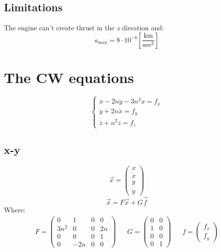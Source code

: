\documentclass[11pt, a4paper]{article}
\begin{document}
\subsection{Limitations}
The engine can't create thrust in the \emph{x} direation and:
\begin{equation*}
    a_\text{max} = 8\cdot10^{-6}\left[\frac{\mathrm{km}}{\mathrm{sec}^2}\right]
\end{equation*}

\section{The CW equations}
\begin{equation}
    \left\{\begin{array}{l}
        \ddot{x}-2n\dot{y}-3n^2x=f_x\\
        \ddot{y}+2n\dot{x}=f_y\\
        \ddot{z}+n^2z=f_z
    \end{array}\right.
\end{equation}

\subsection{x-y}
\begin{equation}
    \vec{x}=\begin{pmatrix}
        x\\\dot{x}\\y\\\dot{y}
    \end{pmatrix}
\end{equation}
\begin{equation}
    \dot{\vec{x}}=F\vec{x}+G\vec{f}
\end{equation}
Where:
\begin{equation}
    \begin{matrix}
        F=\begin{pmatrix}
            0 & 1 & 0 & 0 \\
            3n^2 & 0 & 0 & 2n \\
            0 & 0 & 0 & 1 \\
            0 & -2n & 0 & 0
        \end{pmatrix} && G=\begin{pmatrix}
            0 & 0\\
            1 & 0\\
            0 & 0\\
            0 & 1
        \end{pmatrix} && f=\begin{pmatrix}
            f_x\\f_y
        \end{pmatrix}
    \end{matrix}
\end{equation}
\end{document}
